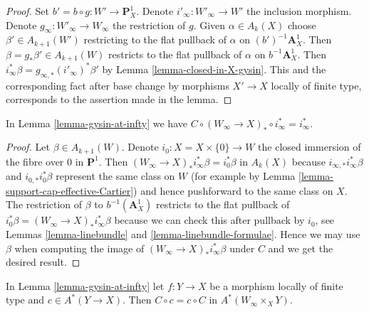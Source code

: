 \begin{proof}
Set $b' = b \circ g : W' \to \mathbf{P}^1_X$. Denote
$i'_\infty : W'_\infty \to W'$ the inclusion morphism.
Denote $g_\infty : W'_\infty \to W_\infty$ the restriction of $g$.
Given $\alpha \in A_k(X)$ choose $\beta' \in A_{k + 1}(W')$
restricting to the flat pullback of $\alpha$ on $(b')^{-1}\mathbf{A}^1_X$.
Then $\beta = g_*\beta' \in A_{k + 1}(W)$ restricts to the
flat pullback of $\alpha$ on $b^{-1}\mathbf{A}^1_X$.
Then $i_\infty^*\beta = g_{\infty, *}(i'_\infty)^*\beta'$
by Lemma \ref{lemma-closed-in-X-gysin}.
This and the corresponding fact after base change by
morphisms $X' \to X$ locally of finite type, corresponds
to the assertion made in the lemma.
\end{proof}

\begin{lemma}
\label{lemma-homomorphism-pre}
In Lemma \ref{lemma-gysin-at-infty} we have
$C \circ (W_\infty \to X)_* \circ i_\infty^* = i_\infty^*$.
\end{lemma}

\begin{proof}
Let $\beta \in A_{k + 1}(W)$. Denote $i_0 : X = X \times \{0\} \to W$
the closed immersion of the fibre over $0$ in $\mathbf{P}^1$. Then
$(W_\infty \to X)_* i_\infty^* \beta = i_0^*\beta$ in $A_k(X)$ because
$i_{\infty, *}i_\infty^*\beta$ and $i_{0, *}i_0^*\beta$
represent the same class on $W$ (for example by
Lemma \ref{lemma-support-cap-effective-Cartier})
and hence pushforward to the same class on $X$.
The restriction of $\beta$ to $b^{-1}(\mathbf{A}^1_X)$
restricts to the flat pullback of
$i_0^*\beta = (W_\infty \to X)_* i_\infty^* \beta$ because we can check
this after pullback by $i_0$, see
Lemmas \ref{lemma-linebundle} and \ref{lemma-linebundle-formulae}.
Hence we may use $\beta$ when computing the image of
$(W_\infty \to X)_*i_\infty^*\beta$ under $C$
and we get the desired result.
\end{proof}

\begin{lemma}
\label{lemma-gysin-at-infty-commutes}
In Lemma \ref{lemma-gysin-at-infty} let $f : Y \to X$ be a morphism
locally of finite type and $c \in A^*(Y \to X)$. Then $C \circ c = c \circ C$
in $A^*(W_\infty \times_X Y)$.
\end{lemma}

